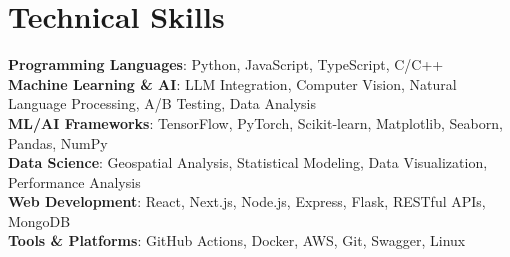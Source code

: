 \documentclass[letterpaper,11pt]{article}
\begin{document}
\section{Technical Skills}
 \begin{itemize}[leftmargin=0.15in, label={}]
    \small{\item{
     \textbf{Programming Languages}{: Python, JavaScript, TypeScript, C/C++} \\
     \textbf{Machine Learning \& AI}{: LLM Integration, Computer Vision, Natural Language Processing, A/B Testing, Data Analysis} \\
     \textbf{ML/AI Frameworks}{: TensorFlow, PyTorch, Scikit-learn, Matplotlib, Seaborn, Pandas, NumPy} \\
     \textbf{Data Science}{: Geospatial Analysis, Statistical Modeling, Data Visualization, Performance Analysis} \\
     \textbf{Web Development}{: React, Next.js, Node.js, Express, Flask, RESTful APIs, MongoDB} \\
     \textbf{Tools \& Platforms}{: GitHub Actions, Docker, AWS, Git, Swagger, Linux}
    }}
 \end{itemize}
\end{document}
